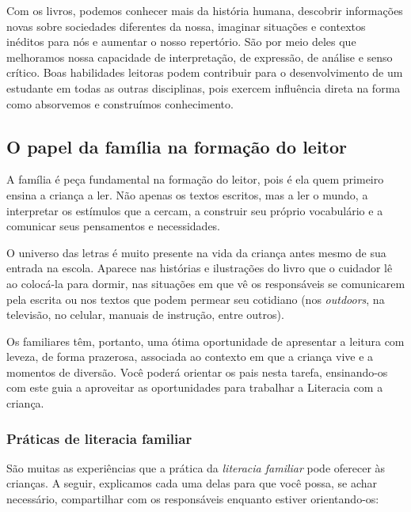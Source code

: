\documentclass[11pt]{extarticle}
\begin{document}
Com os livros, podemos conhecer mais da história humana, descobrir informações 
novas sobre sociedades diferentes da nossa, imaginar situações e contextos inéditos 
para nós e aumentar o nosso repertório. São por meio deles que melhoramos nossa 
capacidade de interpretação, de expressão, de análise e senso crítico. Boas habilidades 
leitoras podem contribuir para o desenvolvimento de um estudante em todas as outras 
disciplinas, pois exercem influência direta na forma como absorvemos e 
construímos conhecimento.


\subsection{O papel da família na formação do leitor}
A família é peça fundamental na formação do leitor, pois é ela quem primeiro 
ensina a criança a ler. Não apenas os textos escritos, mas a ler o mundo, a 
interpretar os estímulos que a cercam, a construir seu próprio vocabulário e a 
comunicar seus pensamentos e necessidades.

O universo das letras é muito presente na vida da criança antes mesmo de sua 
entrada na escola. Aparece nas histórias e ilustrações do livro que o cuidador 
lê ao colocá-la para dormir, nas situações em que vê os responsáveis se comunicarem 
pela escrita ou nos textos que podem permear seu cotidiano (nos \textit{outdoors}, na 
televisão, no celular, manuais de instrução, entre outros). 

Os familiares têm, 
portanto, uma ótima oportunidade de apresentar a leitura com leveza, de forma 
prazerosa, associada ao contexto em que a criança vive e a momentos de diversão. 
Você poderá orientar os pais nesta tarefa, ensinando-os com este guia a aproveitar 
as oportunidades para trabalhar a Literacia com a criança.


\subsubsection{Práticas de literacia familiar} 

São muitas as experiências que a prática da \textit{literacia familiar} 
pode oferecer às crianças. A seguir, explicamos cada uma delas para que você possa, 
se achar necessário, compartilhar com os responsáveis enquanto estiver orientando-os: 

\end{document}
